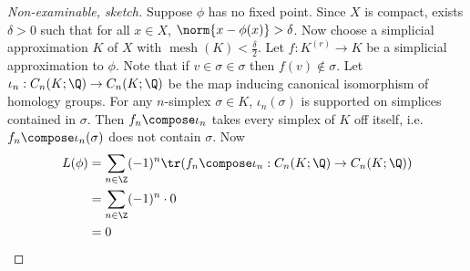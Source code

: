 \documentclass[a4paper]{article}
\DeclareMathOperator{\mesh}{mesh}
\begin{document}
\begin{proof}[Non-examinable, sketch]
  Suppose \(\phi\) has no fixed point. Since \(X\) is compact, exists \(\delta > 0\) such that for all \(x \in X\), \(\norm{x - \phi(x)} > \delta\). Now choose a simplicial approximation \(K\) of \(X\) with \(\mesh(K) < \frac{\delta}{2}\). Let \(f: K^{(r)} \to K\) be a simplicial approximation to \(\phi\). Note that if \(v \in \sigma \in \sigma\) then \(f(v) \notin \sigma\). Let \(\iota_n: C_n(K; \Q) \to C_n(K; \Q)\) be the map inducing canonical isomorphism of homology groups. For any \(n\)-simplex \(\sigma \in K\), \(\iota_n(\sigma)\) is supported on simplices contained in \(\sigma\). Then \(f_n \compose \iota_n\) takes every simplex of \(K\) off itself, i.e.\ \(f_n \compose \iota_n (\sigma)\) does not contain \(\sigma\). Now
  \begin{align*}
    L(\phi)
    &= \sum_{n \in \Z} (-1)^n \tr(f_n \compose \iota_n: C_n(K; \Q) \to C_n(K; \Q)) \\
    &= \sum_{n \in \Z} (-1)^n \cdot 0 \\
    &= 0
  \end{align*}
\end{proof}

\printindex
\end{document}
